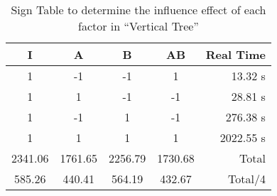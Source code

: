 \begin{table}[h]
	\caption{Sign Table to determine the influence effect of each factor in ``Vertical Tree''}
	\center
	\begin{tabular}{ c c c c r }
		\hline
		I & A & B & AB & Real Time \\
		\hline
		1 & -1 & -1 &  1 &   13.32 s \\
		1 &  1 & -1 & -1 &   28.81 s \\
		1 & -1 &  1 & -1 &  276.38 s \\
		1 &  1 &  1 &  1 & 2022.55 s \\
		\hline
		2341.06 & 1761.65 & 2256.79 & 1730.68 & Total \\
		585.26 & 440.41 & 564.19 & 432.67 & Total/4 \\
		\hline
	\end{tabular}
\end{table}